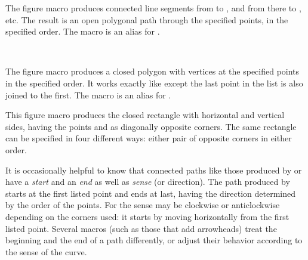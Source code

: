 \documentclass[letterpaper]{article}
\begin{document}
The figure macro  produces connected line segments from
 to , and from there to , etc. The
result is an open polygonal path through the specified points, in the
specified order. The macro  is an alias for .

\begin{cd}
\\
%
%
\end{cd}

The figure macro  produces a closed polygon with vertices
at the specified points in the specified order. It works exactly like
 except the last point in the list is also joined to the
first. The macro  is an alias for .

\begin{cd}
%
\end{cd}

This figure macro produces the closed rectangle with horizontal and
vertical sides, having the points  and  as
diagonally opposite corners. The same rectangle can be specified in four
different ways: either pair of opposite corners in either order.

It is occasionally helpful to know that connected paths like those
produced by  or  have a \emph{start} and an
\emph{end} as well as \emph{sense} (or direction). The path produced by
 starts at the first listed point and ends at last, having
the direction determined by the order of the points. For  the
sense may be clockwise or anticlockwise depending on the corners used:
it starts by moving horizontally from the first listed point.
Several \mfp{} macros (such as those that add arrowheads) treat the
beginning and the end of a path differently, or adjust their behavior
according to the sense of the curve.

\begin{cd}
%
\end{cd}
\end{document}
